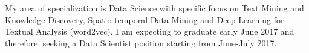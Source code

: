 
My area of specialization is Data Science with specific focus 
on Text Mining and Knowledge Discovery, Spatio-temporal Data Mining and Deep Learning for Textual Analysis (word2vec).
I am expecting to graduate early June 2017 and therefore, seeking a Data Scientist position 
starting from June-July 2017. 
